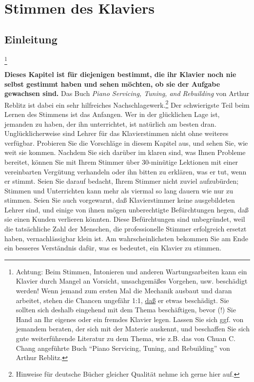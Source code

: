 
\part{Stimmen des Klaviers}
\label{c2}

\chapter{Einleitung}
\label{c2_1}

\footnote{Achtung: Beim Stimmen, Intonieren und anderen Wartungsarbeiten kann ein Klavier durch Mangel an Vorsicht, unsachgemäßes Vorgehen, usw. beschädigt werden!
Wenn jemand zum ersten Mal die Mechanik ausbaut und daran arbeitet, stehen die Chancen ungefähr 1:1, \underline{daß}  er etwas beschädigt.
Sie sollten sich deshalb eingehend mit dem Thema beschäftigen, bevor (!) Sie Hand an Ihr eigenes oder ein fremdes Klavier legen.
Lassen Sie sich ggf. von jemandem beraten, der sich mit der Materie auskennt, und beschaffen Sie sich gute weiterführende Literatur zu dem Thema, wie z.B. das von Chuan C. Chang angeführte Buch \enquote{Piano Servicing, Tuning, and Rebuilding} von Arthur Reblitz.}

\textbf{Dieses Kapitel ist für diejenigen bestimmt, die ihr Klavier noch nie selbst gestimmt haben und sehen möchten, ob sie der Aufgabe gewachsen sind.}
Das Buch \textit{Piano Servicing, Tuning, and Rebuilding} von Arthur Reblitz ist dabei ein sehr hilfreiches Nachschlagewerk.\footnote{Hinweise für deutsche Bücher gleicher Qualität nehme ich gerne hier auf.}
Der schwierigste Teil beim Lernen des Stimmens ist das Anfangen.
Wer in der glücklichen Lage ist, jemanden zu haben, der ihn unterrichtet, ist natürlich am besten dran.
Unglücklicherweise sind Lehrer für das Klavierstimmen nicht ohne weiteres verfügbar.
Probieren Sie die Vorschläge in diesem Kapitel aus, und sehen Sie, wie weit sie kommen.
Nachdem Sie sich darüber im klaren sind, was Ihnen Probleme bereitet, können Sie mit Ihrem Stimmer über 30-minütige Lektionen mit einer vereinbarten Vergütung verhandeln oder ihn bitten zu erklären, was er tut, wenn er stimmt.
Seien Sie darauf bedacht, Ihrem Stimmer nicht zuviel aufzubürden; Stimmen und Unterrichten kann mehr als viermal so lang dauern wie nur zu stimmen.
Seien Sie auch vorgewarnt, daß Klavierstimmer keine ausgebildeten Lehrer sind, und einige von ihnen mögen unberechtigte Befürchtungen hegen, daß sie einen Kunden verlieren könnten.
Diese Befürchtungen sind unbegründet, weil die tatsächliche Zahl der Menschen, die professionelle Stimmer erfolgreich ersetzt haben, vernachlässigbar klein ist.
Am wahrscheinlichsten bekommen Sie am Ende ein besseres Verständnis dafür, was es bedeutet, ein Klavier zu stimmen.

